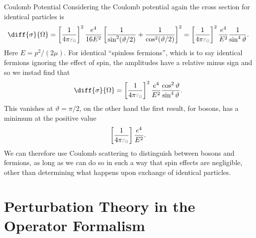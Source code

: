 \documentclass[fleqn]{NotesClass}
\begin{document}
    \begin{exm}{Coulomb Potential}{}
        Considering the Coulomb potential again the cross section for identical particles is
        \begin{equation}
            \diff{\sigma}{\Omega} = \left[ \frac{1}{4\pi\textcolor{gray}{\varepsilon_0}} \right]^2 \frac{e^4}{16E^2} \left[ \frac{1}{\sin^2(\vartheta/2)} + \frac{1}{\cos^2(\vartheta/2)} \right]^2 = \left[ \frac{1}{4\pi\textcolor{gray}{\varepsilon_0}} \right]^2\frac{e^4}{E^2}\frac{1}{\sin^4\vartheta}.
        \end{equation}
        Here \(E = p^2/(2\mu)\).
        For identical \enquote{spinless fermions}, which is to say identical fermions ignoring the effect of spin, the amplitudes have a relative minus sign and so we instad find that
        \begin{equation}
            \diff{\sigma}{\Omega} = \left[ \frac{1}{4\pi\textcolor{gray}{\varepsilon_0}} \right]^2 \frac{e^4}{E^2} \frac{\cos^2\vartheta}{\sin^4\vartheta}.
        \end{equation}
        This vanishes at \(\vartheta = \pi/2\), on the other hand the first result, for bosons, has a minimum at the positive value
        \begin{equation}
            \left[ \frac{1}{4\pi\textcolor{gray}{\varepsilon_0}} \right]\frac{e^4}{E^2}.
        \end{equation}
        We can therefore use Coulomb scattering to distinguish between bosons and fermions, as long as we can do so in such a way that spin effects are negligible, other than determining what happens upon exchange of identical particles.
    \end{exm}
    
    \chapter{Perturbation Theory in the Operator Formalism}
\end{document}
